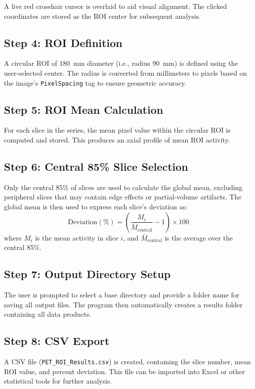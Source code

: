 \documentclass[12pt]{article}
\begin{document}
A live red crosshair cursor is overlaid to aid visual alignment. The clicked coordinates are stored as the ROI center for subsequent analysis.

\subsection{Step 4: ROI Definition}
A circular ROI of 180~mm diameter (i.e., radius 90~mm) is defined using the user-selected center. The radius is converted from millimeters to pixels based on the image’s \texttt{PixelSpacing} tag to ensure geometric accuracy.

\subsection{Step 5: ROI Mean Calculation}
For each slice in the series, the mean pixel value within the circular ROI is computed and stored. This produces an axial profile of mean ROI activity.

\subsection{Step 6: Central 85\% Slice Selection}
Only the central 85\% of slices are used to calculate the global mean, excluding peripheral slices that may contain edge effects or partial-volume artifacts. The global mean is then used to express each slice’s deviation as:
\[
\text{Deviation}(\%) = \left( \frac{M_i}{\bar{M}_{\text{central}}} - 1 \right) \times 100
\]
where $M_i$ is the mean activity in slice $i$, and $\bar{M}_{\text{central}}$ is the average over the central 85\%.

\subsection{Step 7: Output Directory Setup}
The user is prompted to select a base directory and provide a folder name for saving all output files. The program then automatically creates a results folder containing all data products.

\subsection{Step 8: CSV Export}
A CSV file (\texttt{PET\_ROI\_Results.csv}) is created, containing the slice number, mean ROI value, and percent deviation. This file can be imported into Excel or other statistical tools for further analysis.
\end{document}
